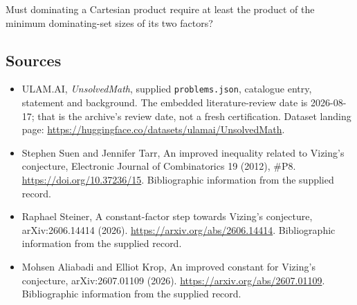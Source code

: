 \documentclass[11pt,a4paper]{article}
\begin{document}
Must dominating a Cartesian product require at least the product of the minimum dominating-set sizes of its two factors?

\subsection{Sources}

{\small

\begin{itemize}

\item[\hypertarget{source:statement:1}{S1}] ULAM.AI, \emph{UnsolvedMath}, supplied \texttt{problems.json}, catalogue entry, statement and background. The embedded literature-review date is 2026-08-17; that is the archive’s review date, not a fresh certification. Dataset landing page: \url{https://huggingface.co/datasets/ulamai/UnsolvedMath}.

\item[\hypertarget{source:statement:2}{S2}] Stephen Suen and Jennifer Tarr, An improved inequality related to Vizing's conjecture, Electronic Journal of Combinatorics 19 (2012), \#P8. \url{https://doi.org/10.37236/15}. Bibliographic information from the supplied record.

\item[\hypertarget{source:statement:3}{S3}] Raphael Steiner, A constant-factor step towards Vizing's conjecture, arXiv:2606.14414 (2026). \url{https://arxiv.org/abs/2606.14414}. Bibliographic information from the supplied record.

\item[\hypertarget{source:statement:4}{S4}] Mohsen Aliabadi and Elliot Krop, An improved constant for Vizing's conjecture, arXiv:2607.01109 (2026). \url{https://arxiv.org/abs/2607.01109}. Bibliographic information from the supplied record.

\end{itemize}

}

\label{end:statement}
\end{document}
